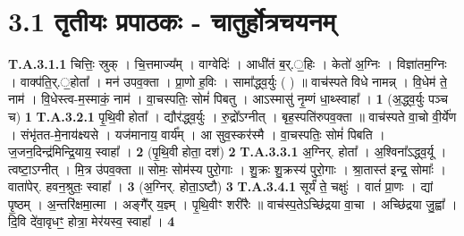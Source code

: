 \documentclass[17pt]{extarticle}
\begin{document}
\section*{ 3.1     तृतीयः प्रपाठकः - चातुर्होत्रचयनम् }
                                \textbf{ T.A.3.1.1} \newline
                  चित्तिः॒ स्रुक् । चि॒त्तमाज्य᳚म् । वाग्वेदिः॑ । आधी॑तं ब॒र्.॒हिः । केतो॑ अ॒ग्निः । विज्ञा॑तम॒ग्निः । वाक्प॑ति॒र्.॒होता᳚ । मन॑ उपव॒क्ता । प्रा॒णो ह॒विः । सामा᳚द्ध्व॒र्युः ( ) ॥ वाच॑स्पते विधे नामन्न् । वि॒धेम॑ ते॒ नाम॑ । वि॒धेस्त्व-म॒स्माकं॒ नाम॑ । वा॒चस्पतिः॒ सोमं॑ पिबतु । आऽस्मासु॑ नृ॒म्णं धा॒थ्स्वाहा᳚ । \textbf{ 1} \newline
                  \newline
                                                        (अ॒द्ध्व॒र्युः पञ्च च) \textbf{1} \newline \newline
                                \textbf{ T.A.3.2.1} \newline
                  पृ॒थि॒वी होता᳚ । द्यौर॑द्ध्व॒र्युः । रु॒द्रो᳚ऽग्नीत् । बृह॒स्पति॑रुपव॒क्ता ॥ वाच॑स्पते वा॒चो वी॒र्ये॑ण । संभृ॑तत-मे॒नाय॑क्ष्यसे । यज॑मानाय॒ वार्य᳚म् ।  आ सुव॒स्कर॑स्मै । वा॒चस्पतिः॒ सोमं॑ पिबति ।  ज॒जन॒दिन्द्र॑मिन्द्रि॒याय॒ स्वाहा᳚ । \textbf{ 2} \newline
                  \newline
                                                        (पृ॒थि॒वी होता॒ दश॑) \textbf{2} \newline \newline
                                \textbf{ T.A.3.3.1} \newline
                  अ॒ग्निर्. होता᳚ । अ॒श्विना᳚ऽद्ध्व॒र्यू । त्वष्टा॒ऽग्नीत् । मि॒त्र उ॑पव॒क्ता ॥ सोमः॒ सोम॑स्य पुरो॒गाः । शु॒क्रः शु॒क्रस्य॑ पुरो॒गाः । श्रा॒तास्त॑ इन्द्र॒ सोमाः᳚ । वाता॑पेर्. हवन॒श्रुतः॒ स्वाहा᳚ । \textbf{ 3} \newline
                  \newline
                                                        (अ॒ग्निर्. होता॒ऽष्टौ) \textbf{3} \newline \newline
                                \textbf{ T.A.3.4.1} \newline
                  सूर्यं॑ ते॒ चक्षुः॑ । वातं॑ प्रा॒णः ।  द्यां पृ॒ष्ठम् । अ॒न्तरि॑क्षमा॒त्मा ।  अङ्गै᳚र् य॒ज्ञ्म् । पृ॒थि॒वीꣳ शरी॑रैः ॥ वाच॑स्प॒तेऽच्छि॑द्रया वा॒चा । अच्छि॑द्रया जु॒ह्वा᳚ । दि॒वि दे॑वा॒वृधꣳ॒॒ होत्रा॒ मेर॑यस्व॒ स्वाहा᳚ । \textbf{ 4} \newline
\end{document}
